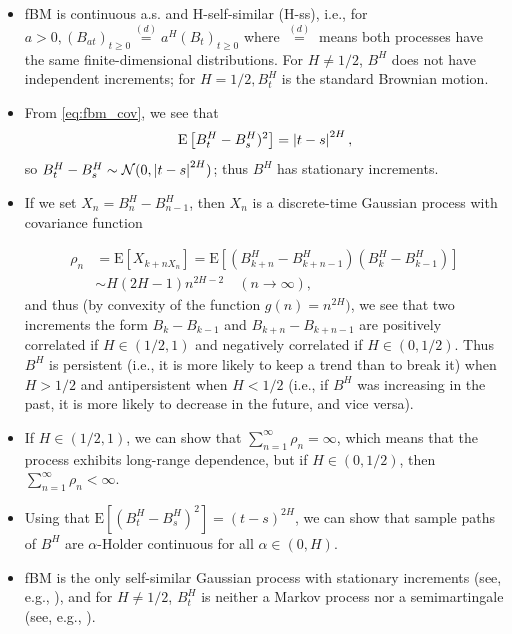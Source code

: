 \documentclass[11pt]{article}
\newcommand{\expt}[1]{\mathrm{E}\left[#1\right]}
\begin{document}
\begin{itemize}
	\item fBM is continuous a.s. and H-self-similar (H-ss), i.e., for $a>0, (B_{at})_{t \ge 0}  \overset{(d)}{=} a^H (B_t)_{t \ge 0}$ where $ \overset{(d)}{=}$ means both processes have the same finite-dimensional distributions. For $H \neq 1/2$, $B^H$ does not have independent increments; for $H=1/2, B^H_t$ is the standard Brownian motion. 
	\item From \eqref{eq:fbm_cov}, we see that 
	\begin{equation*}
	\expt{B_t^H-B_s^H)^2}=\abs{t-s}^{2H},
	\end{equation*}
so $B_t^H-B_s^H \sim \mathcal{N}(0,\left\lvert t-s\right\rvert^{2H})$; thus $B^H$ has stationary increments.
\item If we set $X_n=B^H_n-B^H_{n-1}$, then $X_n$ is a  discrete-time Gaussian process with covariance function

\begin{align*}
\rho_n&=\expt{X_{k+n X_n}}=\expt{\left(B_{k+n}^H -B^H_{k+n-1}\right)\left(B_{k}^H -B^H_{k-1}\right)}\\
&\sim H (2H-1) n^{2H-2}\quad (n \rightarrow \infty),
\end{align*}
and thus (by convexity of the function $g(n) = n^{2H})$, we see that two increments the form $B_k-B_{k-1}$ and $B_{k+n}-B_{k+n-1}$ are positively correlated if $H  \in (1/2,1)$ and negatively correlated if $H \in (0,1/2)$. Thus $B^H$ is persistent (i.e., it is more likely to keep a trend than to break it) when $H>1/2$ and antipersistent when $H<1/2$ (i.e., if $B^H$ was increasing in the past, it is more likely to decrease in the future, and vice versa).

\item If $H \in (1/2,1)$, we can show that $\sum_{n=1}^\infty \rho_n= \infty$, which means that the process exhibits long-range dependence, but if $H \in(0, 1/2)$, then  $\sum_{n=1}^\infty \rho_n< \infty$.

\item Using that $\expt{(B^H_t- B^H_s)^2} = (t-s)^{2H}$, we can show that sample paths of $B^H$ are $\alpha$-H\:older continuous for all $\alpha \in (0,H)$.
\item fBM is the only self-similar Gaussian process with stationary increments (see, e.g., \cite{marquardt2006fractional}), and for $H\neq 1/2$, $B^H_t$ is neither a Markov process nor a semimartingale (see, e.g., \cite{nualart2006malliavin}).
\end{itemize}
\end{document}
